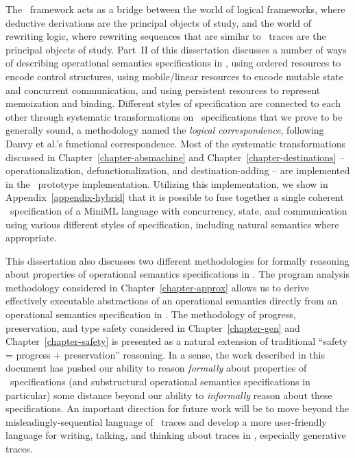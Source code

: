 The \sls~framework acts as a bridge between the world of logical
frameworks, where deductive derivations are the principal objects of
study, and the world of rewriting logic, where rewriting sequences
that are similar to \sls~traces are the principal objects of
study. Part~II of this dissertation discusses a number of ways of
describing operational semantics specifications in \sls, using ordered
resources to encode control structures, using mobile/linear resources
to encode mutable state and concurrent communication, and using
persistent resources to represent memoization and binding. Different
styles of specification are connected to each other through
systematic transformations on \sls~specifications that we prove to be
generally sound, a methodology named the {\it logical correspondence},
following Danvy et al.'s functional correspondence. Most of the
systematic transformations discussed in
Chapter~\ref{chapter-absmachine} and
Chapter~\ref{chapter-destinations} -- operationalization,
defunctionalization, and destination-adding -- are implemented in the
\sls~prototype implementation. Utilizing this implementation, we show
in Appendix~\ref{appendix-hybrid} that it is possible to fuse together
a single coherent \sls~specification of a MiniML language with
concurrency, state, and communication using various different styles
of specification, including natural semantics where appropriate.


This dissertation also discusses two different methodologies for
formally reasoning about properties of operational semantics
specifications in \sls. The program analysis methodology considered in
Chapter~\ref{chapter-approx} allows us to derive effectively
executable abstractions of an operational semantics directly from an
operational semantics specification in \sls. The methodology of
progress, preservation, and type safety considered in
Chapter~\ref{chapter-gen} and Chapter~\ref{chapter-safety} is
presented as a natural extension of traditional ``safety = progress +
preservation'' reasoning. In a sense, the work described in this
document has pushed our ability to reason {\it formally} about
properties of \sls~specifications (and substructural operational
semantics specifications in particular) some distance beyond our
ability to {\it informally} reason about these specifications. An
important direction for future work will be to move beyond the
misleadingly-sequential language of \sls~traces and develop a more
user-friendly language for writing, talking, and thinking about traces
in \sls, especially generative traces.

